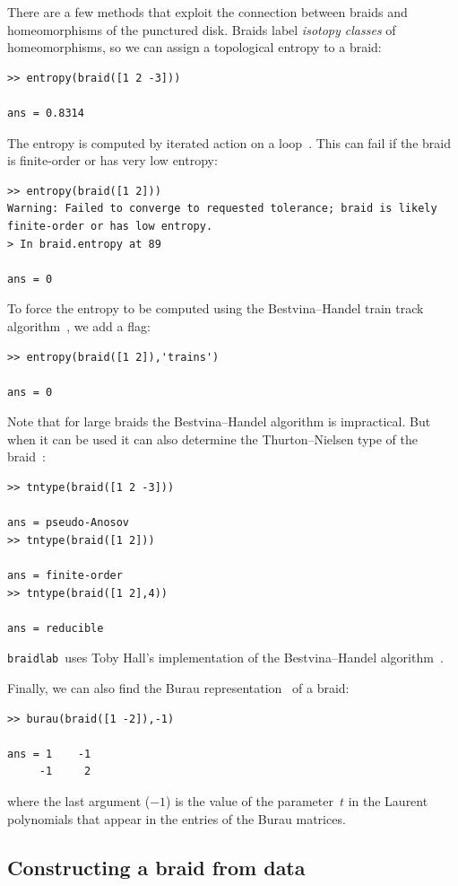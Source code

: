 \documentclass[12pt]{article}
\newcommand{\braidlab}{\texttt{braidlab}}%
\begin{document}
There are a few methods that exploit the connection between braids and
homeomorphisms of the punctured disk.  Braids label \emph{isotopy
  classes} of homeomorphisms, so we can assign a topological entropy
to a braid:
\begin{lstlisting}[frame=single,framerule=0pt]
>> entropy(braid([1 2 -3]))

ans = 0.8314
\end{lstlisting}
The entropy is computed by iterated action on a
loop~\citep{Moussafir2006}.  This can fail if the braid is
finite-order or has very low entropy:
\begin{lstlisting}[frame=single,framerule=0pt]
>> entropy(braid([1 2]))
Warning: Failed to converge to requested tolerance; braid is likely finite-order or has low entropy. 
> In braid.entropy at 89

ans = 0
\end{lstlisting}

To force the entropy to be computed using
the Bestvina--Handel train track algorithm~\cite{Bestvina1995}, we add
a flag:
\begin{lstlisting}[frame=single,framerule=0pt]
>> entropy(braid([1 2]),'trains')

ans = 0
\end{lstlisting}
Note that for large braids the Bestvina--Handel algorithm is
impractical.  But when it can be used it can also determine the
Thurton--Nielsen type of the
braid~\citep{Fathi1979,Thurston1988,Casson1988,Boyland1994}:
\begin{lstlisting}[frame=single,framerule=0pt]
>> tntype(braid([1 2 -3]))

ans = pseudo-Anosov
>> tntype(braid([1 2]))

ans = finite-order
>> tntype(braid([1 2],4))

ans = reducible
\end{lstlisting}
\braidlab\ uses Toby Hall's implementation of the Bestvina--Handel
algorithm~\citep{HallTrain}.

Finally, we can also find the Burau
representation~\citep{Burau1936,Birman1975} of a braid:
\begin{lstlisting}[frame=single,framerule=0pt]
>> burau(braid([1 -2]),-1)

ans = 1    -1
     -1     2
\end{lstlisting}
where the last argument ($-1$) is the value of the parameter~$t$ in
the Laurent polynomials that appear in the entries of the Burau
matrices.


\subsection{Constructing a braid from data}
\label{sec:braidfromdata}
\end{document}
